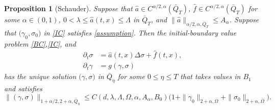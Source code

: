 \documentclass[a4paper,11pt]{article}
\newtheorem{proposition}{Proposition}[section]
\theoremstyle{remark}
\begin{document}
\begin{proposition}[Schauder] Suppose that $\hat{a}\in C^{\alpha/2,\alpha}(\bar{Q}_T)$, $\hat{f}\in C^{\alpha/2,\alpha}(\bar{Q}_T)$ for some $\alpha \in (0,1)$, $0<\lambda \le \hat{a}(t,x) \le \Lambda$ in $\bar{Q}_T$, and $\|\hat{a}\|_{\alpha/2,\alpha,\bar{Q}_T} \le A_\alpha$. Suppose that $\big(\gamma_0,\sigma_0\big)$ in \eqref{IC} satisfies \eqref{assumption}. Then the initial-boundary value problem \eqref{BC},\eqref{IC}, and
\begin{equation}\label{Aux0}
\begin{aligned}
 \partial_t \sigma &= \hat{a}(t,x) \Delta \sigma + \hat{f}(t,x) ,\\
 \partial_t \gamma &= g(\gamma,\sigma)
\end{aligned}
\end{equation}
has the unique solution $\big(\gamma,\sigma\big)$ in $\bar{Q}_\eta$ for some $0\le\eta\le T$ that takes values in $B_1$ and satisfies
\begin{equation} \label{est0}
 \|(\gamma,\sigma)\|_{1+\alpha/2, 2+\alpha,\bar{Q}_{\eta}} \le C(d,\lambda,\Lambda,\Omega,\alpha,A_\alpha,B_0) \Big(1 + \|\gamma_0\|_{2+\alpha,\bar\Omega} +  \|\sigma_0\|_{2+\alpha,\bar\Omega}\Big).
\end{equation}
\end{proposition}
\end{document}
